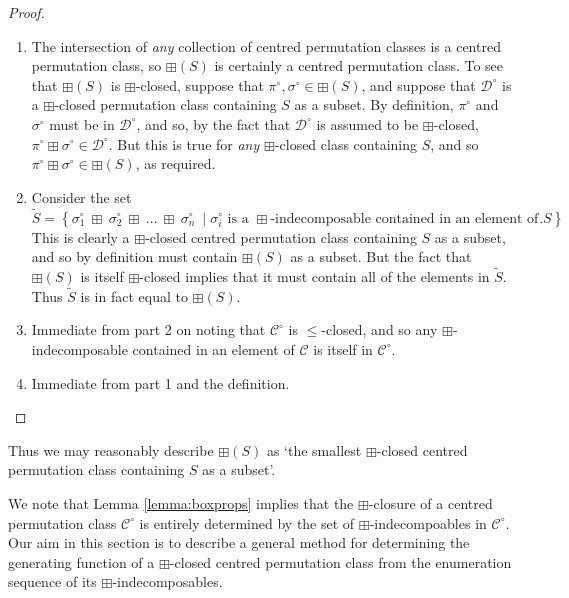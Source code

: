 \documentclass[11pt,a4paper]{article}
\theoremstyle{definition}
\begin{document}
\begin{proof}
\begin{enumerate}
\item The intersection of \emph{any} collection of centred permutation classes is a centred permutation class, so $\boxplus(S)$ is certainly a centred permutation class. To see that $\boxplus(S)$ is $\boxplus$-closed, suppose that $\pi^{\circ},\sigma^{\circ} \in \boxplus(S)$, and suppose that $\mathcal{D}^{\circ}$ is a $\boxplus$-closed permutation class containing $S$ as a subset. By definition, $\pi^{\circ}$ and $\sigma^{\circ}$ must be in $\mathcal{D}^{\circ}$, and so, by the fact that $\mathcal{D}^{\circ}$ is assumed to be $\boxplus$-closed, $\pi^{\circ} \boxplus \sigma^{\circ} \in \mathcal{D}^{\circ}$. But this is true for \emph{any} $\boxplus$-closed class containing $S$, and so $\pi^{\circ} \boxplus \sigma^{\circ} \in \boxplus(S)$, as required.
\item Consider the set
\[
\widetilde{S} = \left\{\sigma^{\circ}_{1} \ \boxplus \ \sigma^{\circ}_{2} \ \boxplus \ \dots \ \boxplus \ \sigma^{\circ}_{n} \ \mid \text{$\sigma^{\circ}_{i}$ is a $\boxplus$-indecomposable contained in an element of $S$}\right\}.
\]
This is clearly a $\boxplus$-closed centred permutation class containing $S$ as a subset, and so by definition must contain $\boxplus(S)$ as a subset. But the fact that $\boxplus(S)$ is itself $\boxplus$-closed implies that it must contain all of the elements in $\widetilde{S}$. Thus $\widetilde{S}$ is in fact equal to $\boxplus(S)$.
\item Immediate from part 2 on noting that $\mathcal{C}^{\circ}$ is $\leq$-closed, and so any $\boxplus$-indecomposable contained in an element of $\mathcal{C}$ is itself in $\mathcal{C}^{\circ}$.
\item Immediate from part 1 and the definition.\qedhere
\end{enumerate}
\end{proof}

Thus we may reasonably describe $\boxplus(S)$ as `the smallest $\boxplus$-closed centred permutation class containing $S$ as a subset'.

We note that Lemma \ref{lemma:boxprops} implies that the $\boxplus$-closure of a centred permutation class $\mathcal{C}^{\circ}$ is entirely determined by the set of $\boxplus$-indecompoables in $\mathcal{C}^{\circ}$. Our aim in this section is to describe a general method for determining the generating function of a $\boxplus$-closed centred permutation class from the enumeration sequence of its $\boxplus$-indecomposables.
\end{document}
